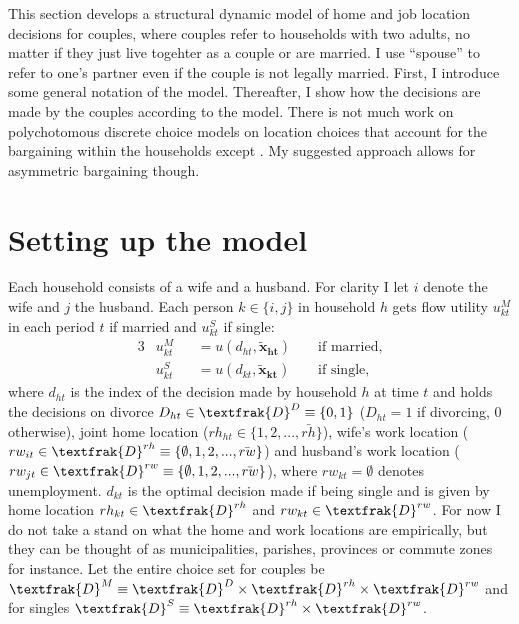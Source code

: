 This section develops a structural dynamic model of home and job location decisions for couples, where couples refer to households with two adults, no matter if they just live togehter as a couple or are married. I use ``spouse'' to refer to one's partner even if the couple is not legally married. First, I introduce some general notation of the model. Thereafter, I show how the decisions are made by the couples according to the model. There is not much work on polychotomous discrete choice models on location choices that account for the bargaining within the households except \cite{Gemici2011}. My suggested approach allows for asymmetric bargaining though.

\section{Setting up the model}\label{sec:setupmodel}
Each household consists of a wife and a husband. For clarity I let $i$ denote the wife and $j$ the husband. Each person $k\in\{i,j\}$ in household $h$ gets flow utility $u_{kt}^M$ in each period $t$ if married and $u_{kt}^S$ if single:
\begin{alignat*}{3}
&u_{kt}^M &&= u(d_{ht},\boldsymbol{\tilde{x}_{ht}}) &&\text{ if married}, \\
&u_{kt}^S &&= u(d_{kt},\boldsymbol{\tilde{x}_{kt}}) &&\text{ if single},
\end{alignat*}
where $d_{ht}$ is the index of the decision made by household $h$ at time $t$ and holds the decisions on divorce $D_{ht}\in\textfrak{D}^D\equiv\{0,1\}$ ($D_{ht}=1$ if divorcing, 0 otherwise), joint home location ($rh_{ht}\in \{1,2,...,\bar{rh}\}$), wife's work location ($rw_{it}\in \textfrak{D}^{rh}\equiv \{\emptyset,1,2,...,\bar{rw}\}$) and husband's work location ($rw_{jt}\in \textfrak{D}^{rw}\equiv \{\emptyset,1,2,...,\bar{rw}\}$), where $rw_{kt}=\emptyset$ denotes unemployment. $d_{kt}$ is the optimal decision made if being single and is given by home location $rh_{kt}\in\textfrak{D}^{rh}$ and $rw_{kt}\in\textfrak{D}^{rw}$. For now I do not take a stand on what the home and work locations are empirically, but they can be thought of as municipalities, parishes, provinces or commute zones for instance. Let the entire choice set for couples be $\textfrak{D}^M\equiv \textfrak{D}^D\times\textfrak{D}^{rh}\times\textfrak{D}^{rw}$ and for singles $\textfrak{D}^S\equiv\textfrak{D}^{rh}\times\textfrak{D}^{rw}$.

